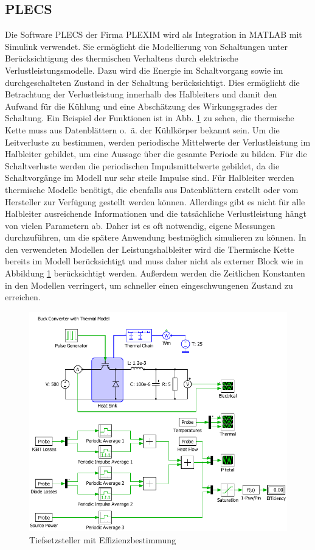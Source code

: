 	\subsection{PLECS}
	Die Software \gls{PLECS} der Firma PLEXIM wird als Integration in MATLAB mit Simulink verwendet.  Sie ermöglicht die Modellierung von Schaltungen unter Berücksichtigung des thermischen Verhaltens durch elektrische Verlustleistungsmodelle. Dazu wird die Energie im Schaltvorgang sowie im durchgeschalteten Zustand in der Schaltung berücksichtigt. Dies ermöglicht die Betrachtung der Verlustleistung innerhalb des Halbleiters und damit den Aufwand für die Kühlung und eine Abschätzung des Wirkungsgrades der Schaltung. Ein Beispiel der Funktionen ist in Abb. \ref{fig:plecsbuck} zu sehen, die thermische Kette muss aus Datenblättern o.~ä. der Kühlkörper bekannt sein. Um die Leitverluste zu bestimmen, werden periodische Mittelwerte der Verlustleistung im Halbleiter gebildet, um eine Aussage über die gesamte Periode zu bilden. Für die Schaltverluste werden die periodischen Impulsmittelwerte gebildet, da die Schaltvorgänge im Modell nur sehr steile Impulse sind. Für Halbleiter werden thermische Modelle benötigt, die ebenfalls aus Datenblättern erstellt oder vom Hersteller zur Verfügung gestellt werden können. Allerdings gibt es nicht für alle Halbleiter ausreichende Informationen und die tatsächliche Verlustleistung hängt von vielen Parametern ab. Daher ist es oft notwendig, eigene Messungen durchzuführen, um die spätere Anwendung bestmöglich simulieren zu können. In den verwendeten Modellen der Leistungshalbleiter wird die Thermische Kette bereits im Modell berücksichtigt und muss daher nicht als externer Block wie in Abbildung \ref{fig:plecsbuck} berücksichtigt werden. Außerdem werden die Zeitlichen Konstanten in den Modellen verringert, um schneller einen eingeschwungenen Zustand zu erreichen. \\
	
	\begin{figure}
		\centering
		\includegraphics[width=1\linewidth]{content/Grafiken/PLECS_Buck}
		\caption[Tiefsetzsteller mit Effizienzbestimmung]{Tiefsetzsteller mit Effizienzbestimmung}
		\label{fig:plecsbuck}
	\end{figure}
	